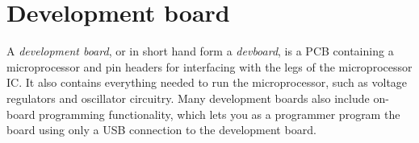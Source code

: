 \section{Development board}

A \textit{development board}, or in short hand form a \textit{devboard}, is a PCB containing a microprocessor and 
pin headers for interfacing with the legs of the microprocessor IC. 
It also contains everything needed to run the microprocessor, such as voltage regulators and oscillator circuitry.
Many development boards also include on-board programming functionality, which lets you as a programmer program 
the board using only a USB connection to the development board.
